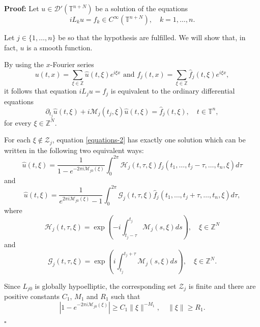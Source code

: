 \documentclass[12pt]{elsarticle}
\numberwithin{equation}{section}
\newenvironment{proof}[1][\noindent \textbf{Proof: }]{#1}{ \hfill $\square$ \vspace{2mm}}
\begin{document}
\begin{proof} Let $u \in \mathcal{D}'(\mathbb{T}^{n+N})$ be a solution  of the equations
	\begin{equation*}
	iL_ku=f_k\in C^\infty(\mathbb{T}^{n+N}), \quad k =1,\ldots, n.
	\end{equation*} 
	
Let $j\in  \{1,\ldots, n\}$ be so that the hypothesis are fulfilled. We will show that, in fact, $u$ is a smooth function.	
	
	
	By  using the $x$-Fourier series
	$$
	u(t, x) = \sum_{\xi \in \mathbb{Z}} \widehat{u}(t,\xi) e^{i \xi x}
	\text{ \ and \ }
	f_j(t, x) = \sum_{\xi \in \mathbb{Z}} \widehat{f}_{j}(t,\xi) e^{i \xi x},
	$$
	it follows that equation $iL_j u=f_j$ is equivalent to the  ordinary differential equations
	\begin{equation}\label{equations-2}
	\partial_{t_j}\widehat{u}(t,\xi)+i\mathcal{M}_j(t_j,\xi)\widehat{u}(t,\xi)=\widehat{f}_j(t,\xi),\quad t\in\mathbb{T}^n, 
	\end{equation}
	for every $\xi\in\mathbb{Z}^N$.
	
	
	For each $\xi \notin \mathcal{Z}_j$,  equation \eqref{equations-2} has exactly one solution which can be written in the following two equivalent ways:	
	\begin{equation}\label{solutions-1}
	\widehat{u}(t,\xi)=\dfrac{1}{{1-e^{-2\pi i\mathcal{M}_{j0}(\xi)}}}\int_{0}^{2\pi}\mathcal{H}_j(t,\tau,\xi)
	\widehat{f}_j(t_1,\ldots,t_j-\tau,\ldots,t_n,\xi)d\tau
	\end{equation}
	and
	\begin{equation}\label{solutions-2}
	\widehat{u}(t,\xi)=\dfrac{1}{{e^{2\pi i\mathcal{M}_{j0}(\xi)} - 1}}
	\int_{0}^{2\pi}\mathcal{G}_j(t,\tau,\xi)
	\widehat{f}_j(t_1,\ldots,t_j+\tau,\ldots,t_n,\xi)d\tau,
	\end{equation}
	where 
	\begin{equation*}
	\mathcal{H}_j(t,\tau,\xi)=
	\exp \left(-i\int_{t_j-\tau}^{t_j}\mathcal{M}_j(s,\xi)ds\right), \quad \xi \in \mathbb{Z}^N
	\end{equation*}
	and
	\begin{equation*}
	\mathcal{G}_j(t,\tau,\xi)= 
	\exp\left( i\int_{t_j}^{t_j+\tau}\mathcal{M}_j(s,\xi)ds\right), \quad \xi \in \mathbb{Z}^N. 
	\end{equation*}
	
	Since $L_{j0}$ is globally hypoelliptic,  the corresponding set $\mathcal{Z}_j$  is finite and there are positive constants $C_1$, $M_1$ and $R_1$ such that 
	\begin{equation}\label{l0j-GH}
	| 1-e^{- 2\pi i\mathcal{M}_{j0}(\xi)} |\geq C_1\|\xi\|^{-M_1},
	\quad  \|\xi\|\geq R_1.
	\end{equation} 
	

\end{proof}
\end{document}

